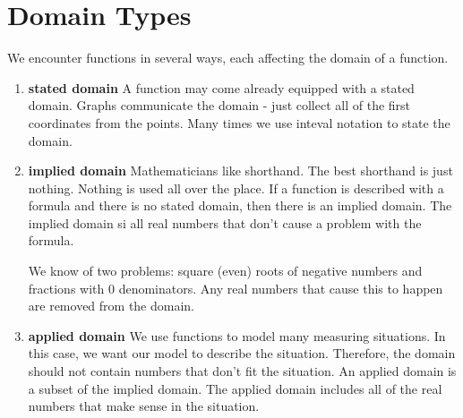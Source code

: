 \documentclass{ximera}
\begin{document}
\section{Domain Types}

We encounter functions in several ways, each affecting the domain of a function.

\begin{enumerate}
\item  \textbf{stated domain}
A function may come already equipped with a stated domain.  Graphs communicate the domain - just collect all of the first coordinates from the points. Many times we use inteval notation to state the domain.


\item  \textbf{implied domain}
Mathematicians like shorthand. The best shorthand is just nothing.  Nothing is used all over the place. If a function is described with a formula and there is no stated domain, then there is an implied domain.  The implied domain si all real numbers that don't cause a problem with the formula.

We know of two problems: square (even) roots of negative numbers and fractions with $0$ denominators.  Any real numbers that cause this to happen are removed from the domain.


\item  \textbf{applied domain}
We use functions to model many measuring situations. In this case, we want our model to describe the situation.  Therefore, the domain should not contain numbers that don't fit the situation. An applied domain is a subset of the implied domain.  The applied domain includes all of the real numbers that make sense in the situation.

\end{enumerate}
\end{document}

